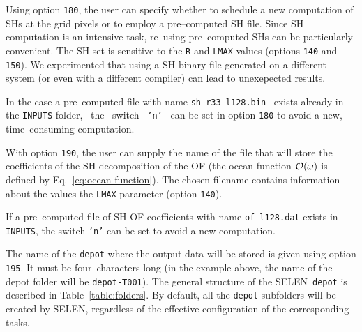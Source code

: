 \documentclass[11pt,fleqn,a4paper,titlepage]{article}
\newcommand\selen{\textsf{SELEN~}}
\newcommand\selens{\textsf{SELEN}}
\begin{document}
\vspace{0.4cm}

{\color{Cyan}{\scriptsize\begin{verbatim}
    ...
    ====> SPHERICAL HARMONICS (SH) FILE AT PIXELS ---------------------------------
    180    A new SH file  (y/n, filename)                    'y'  'sh-r33-l128.bin'  
    ...
\end{verbatim} }}
\noindent Using option \texttt{180}, the user can specify whether to schedule a new computation of SHs at the grid pixels or 
to employ a pre--computed SH file. Since SH computation is an intensive task, re--using pre--computed SHs can be particularly
convenient. The SH set is sensitive to the \texttt{R} and \texttt{LMAX} values (options \texttt{140} and \texttt{150}). We experimented that using a SH binary file generated on a different system (or even with a different compiler) can lead to unexepected results.

In the case a pre--computed file with name \texttt{sh-r33-l128.bin} ~exists already 
in the \texttt{INPUTS} folder, ~the ~switch ~\texttt{'n'} ~can be set in option \texttt{180}
to avoid a new, time--consuming computation. 

\vspace{0.4cm}

{\color{Cyan}{\scriptsize\begin{verbatim}
    ...
    ====> OCEAN FUNCTION (OF) -----------------------------------------------------
    190    A new OF SH decomposition (y/n, filename)         'y'  'of-l128.dat'
    ...
\end{verbatim} }}
\noindent With option \texttt{190}, the user can supply the name of the file that will 
store the coefficients of the SH decomposition of the OF (the ocean
function ${\cal O}(\omega)$ is defined by Eq.~\ref{eq:ocean-function}). 
The chosen filename contains information about the values the \texttt{LMAX} parameter 
(option \texttt{140}). 

If a pre--computed file of SH OF coefficients with name \texttt{of-l128.dat} exists in 
\texttt{INPUTS}, the switch \texttt{'n'} can be set to avoid a new computation. 

\vspace{0.4cm}

{\color{Cyan}{\scriptsize\begin{verbatim}
    ...
    ====> REPOSITORY LABEL --------------------------------------------------------
    195    The depot name  (four characters)                 'T001' 
\end{verbatim} }}
\noindent The name of the \texttt{depot} where the output data will be stored is given using option \texttt{195}. 
It must be four--characters long (in the example above, the name of the depot folder will be 
\texttt{depot-T001}). The general structure of the \selen \texttt{depot} is described in Table~\ref{table:folders}. By default, all 
the \texttt{depot} subfolders will be created by \selens, regardless of the effective configuration of the corresponding tasks. 
\end{document}
